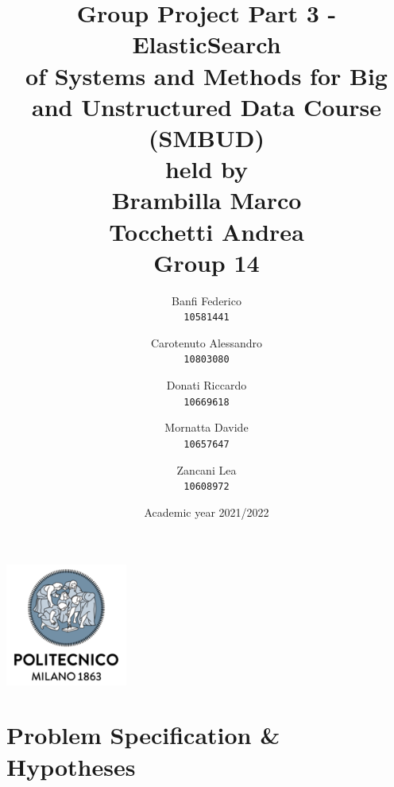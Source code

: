 \documentclass[a4paper,12pt]{article}
\begin{document}
\title{%
  Group Project Part 3 - ElasticSearch \\
  \large of Systems and Methods for Big
    and Unstructured Data Course \\(SMBUD)\\
    held by\\ Brambilla Marco\\ Tocchetti Andrea \\
  \vspace{5mm}
  \Large \textbf{Group 14}}
\author{Banfi Federico\\
  \texttt{10581441}
  \and
  Carotenuto Alessandro\\
  \texttt{10803080}
  \and
  Donati Riccardo\\
  \texttt{10669618}
  \and
  Mornatta Davide\\
  \texttt{10657647}
  \and
  Zancani Lea\\
  \texttt{10608972}}
\date{Academic year 2021/2022}
\maketitle
\begin{center}
  \includegraphics[width=4cm]{polilogo.png}\\
\end{center}
\newpage
\tableofcontents
\newpage
\section{Problem Specification & Hypotheses}
\end{document}
